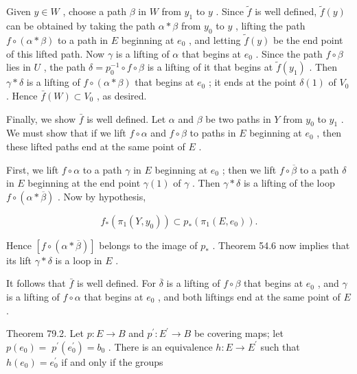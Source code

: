 \documentclass[10pt]{article}
\begin{document}
Given \(y \in  W\) , choose a path \(\beta\) in \(W\) from \({y}_{1}\) to \(y\) . Since \(\widetilde{f}\) is well defined, \(\widetilde{f}\left( y\right)\) can be obtained by taking the path \(\alpha  * \beta\) from \({y}_{0}\) to \(y\) , lifting the path \(f \circ  \left( {\alpha  * \beta }\right)\) to a path in \(E\) beginning at \({e}_{0}\) , and letting \(\widetilde{f}\left( y\right)\) be the end point of this lifted path. Now \(\gamma\) is a lifting of \(\alpha\) that begins at \({e}_{0}\) . Since the path \(f \circ  \beta\) lies in \(U\) , the path \(\delta  = {p}_{0}^{-1} \circ  f \circ  \beta\) is a lifting of it that begins at \(\widetilde{f}\left( {y}_{1}\right)\) . Then \(\gamma  * \delta\) is a lifting of \(f \circ  \left( {\alpha  * \beta }\right)\) that begins at \({e}_{0}\) ; it ends at the point \(\delta \left( 1\right)\) of \({V}_{0}\) . Hence \(\bar{f}\left( W\right)  \subset  {V}_{0}\) , as desired.

Finally, we show \(\bar{f}\) is well defined. Let \(\alpha\) and \(\beta\) be two paths in \(Y\) from \({y}_{0}\) to \({y}_{1}\) . We must show that if we lift \(f \circ  \alpha\) and \(f \circ  \beta\) to paths in \(E\) beginning at \({e}_{0}\) , then these lifted paths end at the same point of \(E\) .

First, we lift \(f \circ  \alpha\) to a path \(\gamma\) in \(E\) beginning at \({e}_{0}\) ; then we lift \(f \circ  \overline{\beta }\) to a path \(\delta\) in \(E\) beginning at the end point \(\gamma \left( 1\right)\) of \(\gamma\) . Then \(\gamma  * \delta\) is a lifting of the loop \(f \circ  \left( {\alpha  * \overline{\beta }}\right)\) . Now by hypothesis,

\[
{f}_{ * }\left( {{\pi }_{1}\left( {Y,{y}_{0}}\right) }\right)  \subset  {p}_{ * }\left( {{\pi }_{1}\left( {E,{e}_{0}}\right) }\right) .
\]

Hence \(\left\lbrack  {f \circ  \left( {\alpha  * \overline{\beta }}\right) }\right\rbrack\) belongs to the image of \({p}_{ * }\) . Theorem 54.6 now implies that its lift \(\gamma  * \delta\) is a loop in \(E\) .

It follows that \(\bar{f}\) is well defined. For \(\overline{\delta }\) is a lifting of \(f \circ  \beta\) that begins at \({e}_{0}\) , and \(\gamma\) is a lifting of \(f \circ  \alpha\) that begins at \({e}_{0}\) , and both liftings end at the same point of \(E\) .

Theorem 79.2. Let \(p : E \rightarrow  B\) and \({p}^{\prime } : {E}^{\prime } \rightarrow  B\) be covering maps; let \(p\left( {e}_{0}\right)  = \; {p}^{\prime }\left( {e}_{0}^{\prime }\right)  = {b}_{0}\) . There is an equivalence \(h : E \rightarrow  {E}^{\prime }\) such that \(h\left( {e}_{0}\right)  = {e}_{0}^{\prime }\) if and only if the groups
\end{document}
